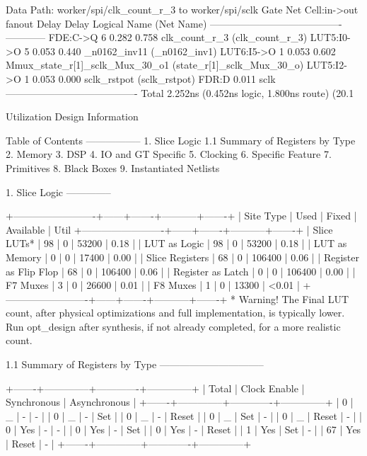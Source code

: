 \documentclass{article}
\begin{document}
  Data Path: worker/spi/clk_count_r_3 to worker/spi/sclk
                                Gate     Net
    Cell:in->out      fanout   Delay   Delay  Logical Name (Net Name)
    ----------------------------------------  ------------
     FDE:C->Q              6   0.282   0.758  clk_count_r_3 (clk_count_r_3)
     LUT5:I0->O            5   0.053   0.440  _n0162_inv11 (_n0162_inv1)
     LUT6:I5->O            1   0.053   0.602  Mmux_state_r[1]_sclk_Mux_30_o1 (state_r[1]_sclk_Mux_30_o)
     LUT5:I2->O            1   0.053   0.000  sclk_rstpot (sclk_rstpot)
     FDR:D                     0.011          sclk
    ----------------------------------------
    Total                      2.252ns (0.452ns logic, 1.800ns route)
                                       (20.1%

\fi
\iffalse

Utilization Design Information

Table of Contents
-----------------
1. Slice Logic
1.1 Summary of Registers by Type
2. Memory
3. DSP
4. IO and GT Specific
5. Clocking
6. Specific Feature
7. Primitives
8. Black Boxes
9. Instantiated Netlists

1. Slice Logic
--------------

+-------------------------+------+-------+-----------+-------+
|        Site Type        | Used | Fixed | Available | Util%
+-------------------------+------+-------+-----------+-------+
| Slice LUTs*             |   98 |     0 |     53200 |  0.18 |
|   LUT as Logic          |   98 |     0 |     53200 |  0.18 |
|   LUT as Memory         |    0 |     0 |     17400 |  0.00 |
| Slice Registers         |   68 |     0 |    106400 |  0.06 |
|   Register as Flip Flop |   68 |     0 |    106400 |  0.06 |
|   Register as Latch     |    0 |     0 |    106400 |  0.00 |
| F7 Muxes                |    3 |     0 |     26600 |  0.01 |
| F8 Muxes                |    1 |     0 |     13300 | <0.01 |
+-------------------------+------+-------+-----------+-------+
* Warning! The Final LUT count, after physical optimizations and full implementation, is typically lower. Run opt_design after synthesis, if not already completed, for a more realistic count.


1.1 Summary of Registers by Type
--------------------------------

+-------+--------------+-------------+--------------+
| Total | Clock Enable | Synchronous | Asynchronous |
+-------+--------------+-------------+--------------+
| 0     |            _ |           - |            - |
| 0     |            _ |           - |          Set |
| 0     |            _ |           - |        Reset |
| 0     |            _ |         Set |            - |
| 0     |            _ |       Reset |            - |
| 0     |          Yes |           - |            - |
| 0     |          Yes |           - |          Set |
| 0     |          Yes |           - |        Reset |
| 1     |          Yes |         Set |            - |
| 67    |          Yes |       Reset |            - |
+-------+--------------+-------------+--------------+
\end{document}
